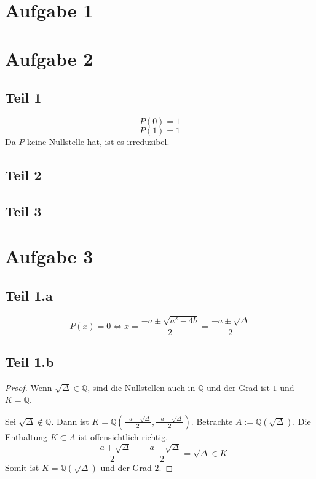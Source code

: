 \documentclass[10pt,a4paper]{article}
\begin{document}
\section{Aufgabe 1}

\section{Aufgabe 2}

\subsection{Teil 1}

\begin{equation}
  P(0) = 1
\end{equation}
\begin{equation}
  P(1) = 1
\end{equation}
Da $P$ keine Nullstelle hat, ist es irreduzibel.

\subsection{Teil 2}

\subsection{Teil 3}

\section{Aufgabe 3}

\subsection{Teil 1.a}

\begin{equation}
  P(x) = 0 \Leftrightarrow x = \frac{-a \pm \sqrt{a^{2} - 4b}}{2} = \frac{-a \pm \sqrt{\Delta}}{2}
\end{equation}

\subsection{Teil 1.b}

\begin{proof}
  Wenn $\sqrt{\Delta} \in \mathbb{Q}$, sind die Nullstellen auch in $\mathbb{Q}$ und der Grad ist $1$ und $K = \mathbb{Q}$.

  Sei $\sqrt{\Delta} \not\in \mathbb{Q}$.
  Dann ist $K = \mathbb{Q}(\frac{-a + \sqrt{\Delta}}{2}, \frac{-a - \sqrt{\Delta}}{2})$.
  Betrachte $A := \mathbb{Q}(\sqrt{\Delta})$.
  Die Enthaltung $K \subset A$ ist offensichtlich richtig.
  \begin{equation}
    \frac{-a + \sqrt{\Delta}}{2} - \frac{-a - \sqrt{\Delta}}{2} = \sqrt{\Delta} \in K
  \end{equation}
  Somit ist $K = \mathbb{Q}(\sqrt{\Delta})$ und der Grad $2$.
\end{proof}
\end{document}
